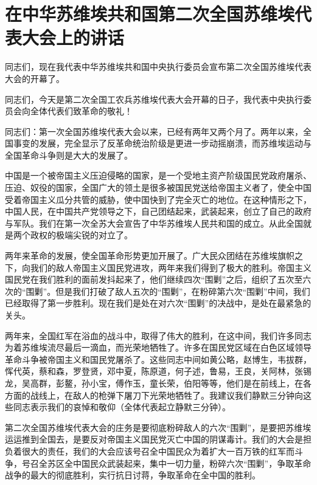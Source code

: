 \section[在中华苏维埃共和国第二次全国苏维埃代表大会上的讲话（一九三四年一月）]{在中华苏维埃共和国第二次全国苏维埃代表大会上的讲话}


同志们，现在我代表中华苏维埃共和国中央执行委员会宣布第二次全国苏维埃代表大会的开幕了。

同志们，今天是第二次全国工农兵苏维埃代表大会开幕的日子，我代表中央执行委员会向全体代表们致革命的敬礼！

同志们：第一次全国苏维埃代表大会以来，已经有两年又两个月了。两年以来，全国事变的发展，完全显示了反革命统治阶级是更进一步动摇崩溃，而苏维埃运动与全国革命斗争则是大大的发展了。

中国是一个被帝国主义压迫侵略的国家，是一个受地主资产阶级国民党政府屠杀、压迫、奴役的国家，全国广大的领土是很多被国民党送给帝国主义者了，使全中国受着帝国主义瓜分共管的威胁，使中国快到了完全灭亡的地位。在这种情形之下，中国人民，在中国共产党领导之下，自己团结起来，武装起来，创立了自己的政府与军队。我们在第一次全苏大会宣告了中华苏维埃人民共和国的成立。从此全国就是两个政权的极端尖锐的对立了。

两年来革命的发展，使全国革命形势更加开展了。广大民众团结在苏维埃旗帜之下，向我们的敌人帝国主义国民党进攻，两年来我们得到了极大的胜利。帝国主义国民党在我们胜利的面前发抖起来了，他们继续四次“围剿”之后，组织了五次至六次的“围剿”。但是我们打破了敌人五次的“围剿”，在粉碎第六次“围剿”中间，我们已经取得了第一步胜利。现在我们是处在对六次“围剿”的决战中，是处在最紧急的关头。

两年来，全国红军在浴血的战斗中，取得了伟大的胜利，在这中间，我们许多同志为着苏维埃流尽最后一滴血，而光荣地牺牲了。许多在国民党区域在白色区域领导革命斗争被帝国主义和国民党屠杀了。这些同志中间如黄公略，赵博生，韦拔群，恽代英，蔡和森，罗登贤，邓中夏，陈原道，何子述，鲁易，王良，关阿林，张锡龙，吴高群，彭鳌，孙小宝，傅作玉，童长荣，伯阳等等，他们是在前线上，在各方面的战线上，在敌人的枪弹下屠刀下光荣地牺牲了。我建议我们静默三分钟向这些同志表示我们的哀悼和敬仰（全体代表起立静默三分钟）。

第二次全国苏维埃代表大会的庄务是要彻底粉碎敌人的六次“围剿”，是要把苏维埃运运推到全国去，是要反对帝国主义国民党灭亡中国的阴谋毒计。我们的大会是担负着很大的责任，我们的大会应该号召全中国民众为着扩大一百万铁的红军而斗争，号召全苏区全中国民众武装起来，集中一切力量，粉碎六次“围剿”，争取革命战争的最大的彻底胜利，实行抗日讨蒋，争取革命在全中国的胜利。

